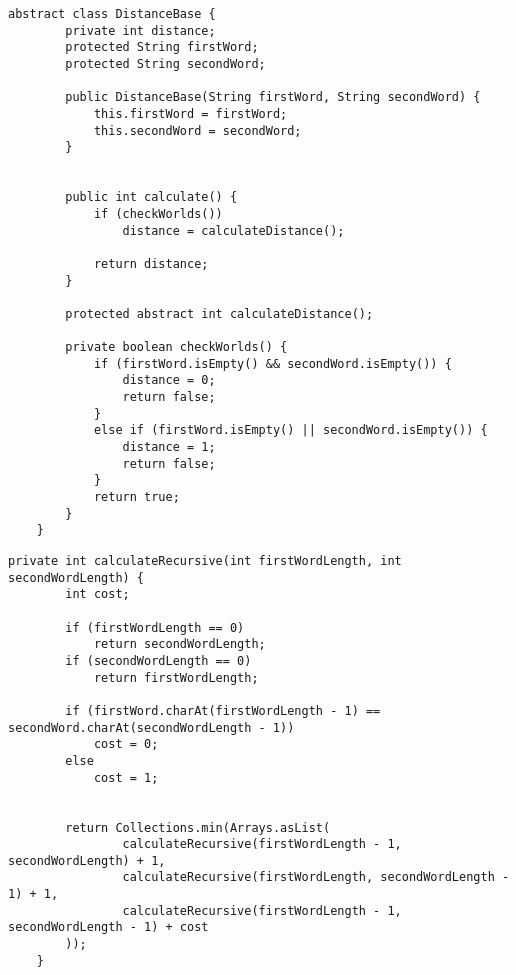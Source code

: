 ﻿\documentclass[12pt]{report}
\begin{document}
\begin{lstlisting}[label=some-code,caption=Базовый класс для вычисления расстояния]
	abstract class DistanceBase {
	    private int distance;
	    protected String firstWord;
	    protected String secondWord;
	
	    public DistanceBase(String firstWord, String secondWord) {
	        this.firstWord = firstWord;
	        this.secondWord = secondWord;
	    }
	
	
	    public int calculate() {
	        if (checkWorlds())
	            distance = calculateDistance();
	
	        return distance;
	    }
	
	    protected abstract int calculateDistance();
	
	    private boolean checkWorlds() {
	        if (firstWord.isEmpty() && secondWord.isEmpty()) {
	            distance = 0;
	            return false;
	        }
	        else if (firstWord.isEmpty() || secondWord.isEmpty()) {
	            distance = 1;
	            return false;
	        }
	        return true;
	    }
	}
\end{lstlisting}

\begin{lstlisting}[label=some-code,caption=Функция нахождения расстояния Дамерау-Левенштейна рекурсивно]
private int calculateRecursive(int firstWordLength, int secondWordLength) {
        int cost;

        if (firstWordLength == 0)
            return secondWordLength;
        if (secondWordLength == 0)
            return firstWordLength;

        if (firstWord.charAt(firstWordLength - 1) == secondWord.charAt(secondWordLength - 1))
            cost = 0;
        else
            cost = 1;


        return Collections.min(Arrays.asList(
                calculateRecursive(firstWordLength - 1, secondWordLength) + 1,
                calculateRecursive(firstWordLength, secondWordLength - 1) + 1,
                calculateRecursive(firstWordLength - 1, secondWordLength - 1) + cost
        ));
    }
\end{lstlisting}
\end{document}
